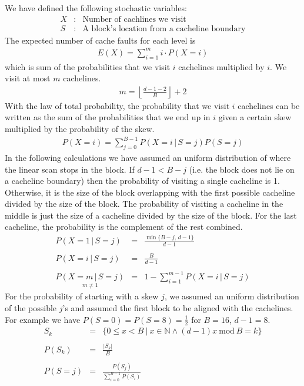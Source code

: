 We have defined the following stochastic variables:
\begin{eqnarray*}
X & : & \textrm{Number of cachlines we visit}\\
S & : & \textrm{A block's location from a cacheline boundary}
\end{eqnarray*}
The expected number of cache faults for each level is
\begin{eqnarray*}
E(X) = \sum_{i=1}^{m}i\cdot P(X=i)
\end{eqnarray*}
which is sum of the probabilities that we visit $i$ cachelines multiplied by $i$. We visit at most $m$ cachelines.
\begin{eqnarray*}
m = \left\lfloor \frac{d-1-2}{B}\right\rfloor + 2
\end{eqnarray*}
With the law of total probability, the probability that we visit $i$ cachelines can be written as the sum of the probabilities that we end up in $i$ given a certain skew multiplied by the probability of the skew.
\begin{eqnarray*}
P(X=i) = \sum_{j=0}^{B-1}P(X=i\,|\, S=j)P(S=j)
\end{eqnarray*}
In the following calculations we have assumed an uniform distribution of where the linear scan stops in the block. If $d - 1 < B - j$ (i.e. the block does not lie on a cacheline boundary) then the probability of visiting a single cacheline is 1. Otherwise, it is the size of the block overlapping with the first possible cacheline divided by the size of the block. The probability of visiting a cacheline in the middle is just the size of a cacheline divided by the size of the block. For the last cacheline, the probability is the complement of the rest combined.
\begin{eqnarray*}
P(X=1\,|\, S=j) & = & \frac{\min\{B-j,\, d-1\}}{d-1}\\
\\
P(X=i\,|\, S=j) & = & \frac{B}{d-1}\\
\\
\underset{m\neq1}{P(X=m\,|\, S=j)} & = & 1-\sum_{i=1}^{m-1}P(X=i\,|\, S=j)
\end{eqnarray*}
For the probability of starting with a skew $j$, we assumed an uniform distribution of the possible $j$'s and assumed the first block to be aligned with the cachelines. For example we have $P(S = 0) = P(S = 8) = \frac{1}{2}$ for $B = 16$, $d - 1 = 8$.
\begin{eqnarray*}
S_k & = & \{ 0 \leq x < B\ |\ x \in \mathbb{N} \wedge (d - 1)x\ \textrm{mod}\ B = k \}\\
\\
P(S_k) & = & \frac{|S_k|}{B}\\
\\
P(S=j) & = & \frac{P(S_j)}{\sum_{i=0}^{B-1}P(S_i)}
\end{eqnarray*}

